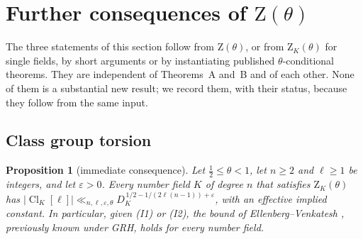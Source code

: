 \documentclass[11pt]{amsart}
\newtheorem{proposition}[theorem]{Proposition}
\theoremstyle{definition}
\theoremstyle{remark}
\DeclareMathOperator{\Cl}{Cl}
\newcommand{\Zt}{\mathrm{Z}}       %
\begin{document}
\section{Further consequences of \texorpdfstring{$\Zt(\theta)$}{Z(theta)}}\label{sec:further}

The three statements of this section follow from $\Zt(\theta)$, or from $\Zt_K(\theta)$ for single fields, by short
arguments or by instantiating published $\theta$-conditional theorems. They are independent of Theorems~A and~B and of
each other. None of them is a substantial new result; we record them, with their status, because they follow from the
same input.

\subsection{Class group torsion}

\begin{proposition}[immediate consequence]\label{prop:C}
Let $\tfrac12\le\theta<1$, let $n\ge2$ and $\ell\ge1$ be integers, and let $\varepsilon>0$. Every number field $K$ of
degree $n$ that satisfies $\Zt_K(\theta)$ has
$|\Cl_K[\ell]|\ll_{n,\ell,\varepsilon,\theta}D_K^{\,1/2-1/(2\ell(n-1))+\varepsilon}$, with an effective implied
constant. In particular, given (I1) or (I2), the bound of Ellenberg--Venkatesh \cite[Prop.~1]{EV}, previously known
under GRH, holds for every number field.
\end{proposition}
\end{document}
